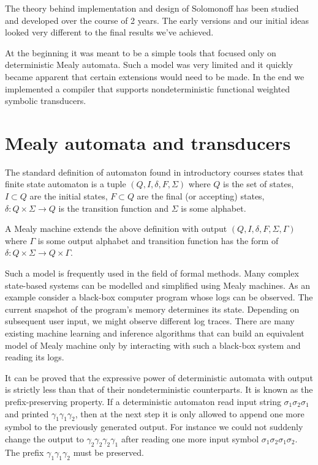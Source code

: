 


The theory behind implementation and design of Solomonoff has been studied and developed over the course of 2 years. The early versions and our initial ideas looked very different to the final results we've achieved. 

At the beginning it was meant to be a simple tools that focused only on deterministic Mealy automata. Such a model was very limited and it quickly became apparent that certain extensions would need to be made. In the end we implemented a compiler that supports nondeterministic functional weighted symbolic transducers. 

\section{Mealy automata and transducers}

The standard definition of automaton found in introductory courses states that finite state automaton is  a tuple $(Q,I,\delta,F,\Sigma)$ where $Q$ is the set of states, $I \subset Q$ are the initial states,  $F \subset Q$ are the final (or accepting) states, $\delta:Q\times \Sigma \rightarrow Q$ is the transition function and $\Sigma$ is some alphabet. 

A Mealy machine extends the above definition with output  $(Q,I,\delta,F,\Sigma,\Gamma)$ where $\Gamma$ is some output alphabet and transition function has the form of $\delta:Q\times \Sigma \rightarrow Q \times \Gamma$. 

Such a model is frequently used in the field of formal methods. Many complex state-based systems can be modelled and simplified using Mealy machines. As an example consider a black-box computer program whose logs can be observed. The current snapshot of the program's memory determines its state. Depending on subsequent user input, we might observe different log traces. There are many existing machine learning and inference algorithms that can build an equivalent model of Mealy machine only by interacting with such a black-box system and reading its logs. 

It can be proved that the expressive power of deterministic automata with output is strictly less than that of their nondeterministic counterparts. It is known as the prefix-preserving  property. If a deterministic automaton read input string $\sigma_1\sigma_2\sigma_1$ and printed $\gamma_1\gamma_1\gamma_2$, then at the next step it is only allowed to append one more symbol to the previously generated output. For instance we could not suddenly change the output to $\gamma_2\gamma_2\gamma_2\gamma_1$ after reading one more input symbol $\sigma_1\sigma_2\sigma_1\sigma_2$. The prefix $\gamma_1\gamma_1\gamma_2$ must be preserved. 

